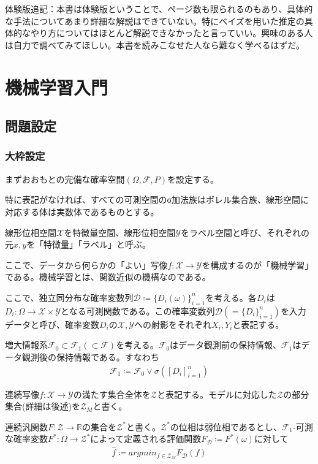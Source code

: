 \documentclass[dvipdfmx, a4paper]{jsarticle}
\begin{document}
体験版追記：本書は体験版ということで、ページ数も限られるのもあり、具体的な手法についてあまり詳細な解説はできていない。特にベイズを用いた推定の具体的なやり方についてはほとんど解説できなかったと言っていい。興味のある人は自力で調べてみてほしい。本書を読みこなせた人なら難なく学べるはずだ。

\newpage
\section{機械学習入門}

\subsection{問題設定}
\subsubsection{大枠設定}
まずおおもとの完備な確率空間$(\Omega,\mathcal{F},P)$を設定する。

特に表記がなければ、すべての可測空間のσ加法族はボレル集合族、線形空間に対応する体は実数体であるものとする。

線形位相空間$\mathcal{X}$を特徴量空間、線形位相空間$\mathcal{Y}$をラベル空間と呼び、それぞれの元$x,y$を「特徴量」「ラベル」と呼ぶ。

ここで、データから何らかの「よい」写像$f:\mathcal{X}\to\mathcal{Y}$を構成するのが「機械学習」である。機械学習とは、関数近似の機構なのである。

ここで、独立同分布な確率変数列$\mathcal{D}\coloneqq\{D_i(\omega)\}_{i=1}^n$を考える。各$D_i$は$D_i\colon\Omega\to\mathcal{X}\times\mathcal{Y}$となる可測関数である。この確率変数列$\mathcal{D}(=\{D_i\}_{i=1}^n)$を入力データと呼び、確率変数$D_i$の$\mathcal{X},\mathcal{Y}$への射影をそれぞれ$X_i,Y_i$と表記する。

増大情報系$\mathcal{F}_0\subset\mathcal{F}_1(\subset\mathcal{F})$を考える。$\mathcal{F}_0$はデータ観測前の保持情報、$\mathcal{F}_1$はデータ観測後の保持情報である。すなわち
\begin{align}
\mathcal{F}_1\coloneqq\mathcal{F}_0\vee\sigma([D_i]^n_{i=1})
\end{align}


連続写像$f\colon\mathcal{X}\to\mathcal{Y}$の満たす集合全体を$\mathcal{Z}$と表記する。モデルに対応した$\mathcal{Z}$の部分集合(詳細は後述)を$\mathcal{Z}_M$と書く。

連続汎関数$F\colon\mathcal{Z}\rightarrow\mathbb{R}$の集合を$\mathcal{Z}^*$と書く。$\mathcal{Z}^*$の位相は弱位相であるとし、$\mathcal{F}_1$-可測な確率変数$F^*\colon\Omega\rightarrow \mathcal{Z}^*$によって定義される評価関数$F_\mathcal{D}\coloneqq F^*(\omega)$に対して
\begin{align}
\hat{f}\coloneqq argmin_{f\in \mathcal{Z}_M}F_\mathcal{D}(f)
\end{align}
\end{document}
